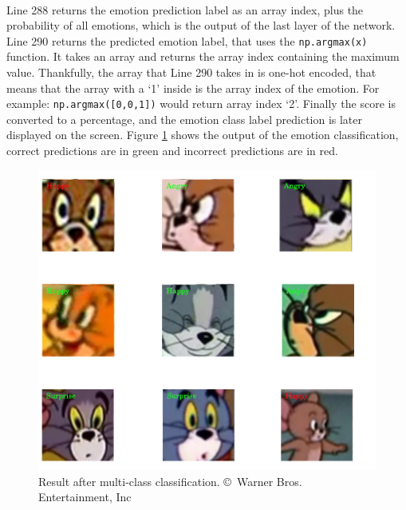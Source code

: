 \documentclass[report, 11pt, oneside]{dissertation}
\begin{document}
\inputminted[frame=single, firstline=353, lastline=356, baselinestretch=1, linenos, breaklines]{python}{train.py}
\label{listing:cnn_model_probabilities}

\ \

Line 288 returns the emotion prediction label as an array index, plus the probability of all emotions, which is the output of the last layer of the network. Line 290 returns the predicted emotion label, that uses the \texttt{np.argmax(x)} function. It takes an array and returns the array index containing the maximum value. Thankfully, the array that Line 290 takes in is one-hot encoded, that means that the array with a `1' inside is the array index of the emotion. For example: \texttt{np.argmax([0,0,1])} would return array index `2'. Finally the score is converted to a percentage, and the emotion class label prediction is later displayed on the screen. Figure \ref{fig:example_results} shows the output of the emotion classification, correct predictions are in green and incorrect predictions are in red.

\begin{figure}[!htb]
   \centering
	\includegraphics[scale=0.65]{figure_29.pdf}
	\caption[Result after multi-class classification.]{Result after multi-class classification. \copyright \ Warner Bros. Entertainment, Inc}
	\label{fig:example_results}
\end{figure}
\end{document}
